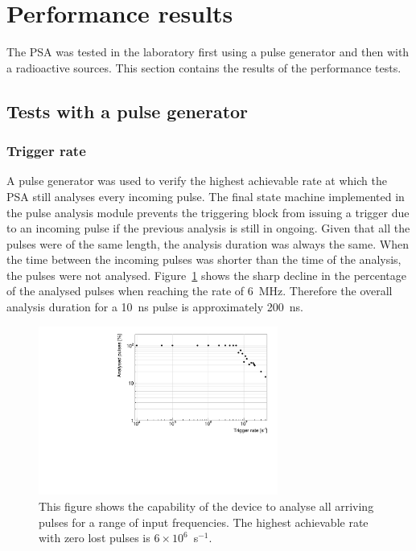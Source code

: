 \section{Performance results}
\label{sec:perres}
The PSA was tested in the laboratory first using a pulse generator and then with a radioactive sources. This section contains the results of the performance tests.

\subsection{Tests with a pulse generator}
\subsubsection{Trigger rate}
A pulse generator was used to verify the highest achievable rate at which the PSA still analyses every incoming pulse. The final state machine implemented in the pulse analysis module prevents the triggering block from issuing a trigger due to an incoming pulse if the previous analysis is still in ongoing. Given that all the pulses were of the same length, the analysis duration was always the same. When the time between the incoming pulses was shorter than the time of the analysis, the pulses were not analysed. Figure~\ref{fig:trigrate} shows the sharp decline in the percentage of the analysed pulses when reaching the rate of 6~MHz. Therefore the overall analysis duration for a 10~ns pulse is approximately 200~ns.

\begin{figure}[!t]
\centering
\includegraphics[width=0.7\textwidth]{../scripts/05_current_monitoring/PulseGenTests/plots/freq}
\caption{This figure shows the capability of the device to analyse all arriving pulses for a range of input frequencies. The highest achievable rate with zero lost pulses is $6\times10^6$~s$^{-1}$.}
\label{fig:trigrate}
\end{figure}

